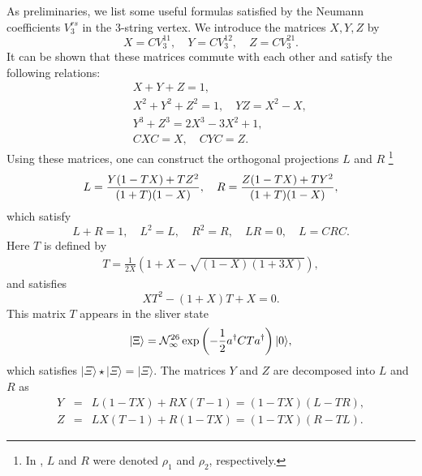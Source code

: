 \documentclass[a4paper,12pt]{article}
\def\hf{{1\over 2}}
\def\o{\over}
\def\ket{\rangle}
\def\lf{\left}
\def\ri{\right}
\def\dag{\dagger}
\def\a{a^{\dag}}
\begin{document}
As preliminaries, we list some useful formulas satisfied by
the Neumann coefficients $V^{rs}_3$ in the 3-string vertex.
We introduce the matrices $X,Y,Z$ by 
\begin{equation}
X=CV^{11}_3,\quad Y=CV^{12}_3,\quad Z=CV^{21}_3.
\end{equation}
It can be shown that these matrices commute with each other
and satisfy the following relations:
\begin{eqnarray}
 &&X+Y+Z=1, \\
&&X^2+Y^2+Z^2=1,\quad YZ=X^2-X,\\
&&Y^3+Z^3=2X^3-3X^2+1, \\
&&CXC=X,\quad CYC =Z.
\end{eqnarray}
Using these matrices,
one can construct the orthogonal projections $L$ and $R$ 
\footnote{In \cite{RSZ2}, $L$ and $R$ were denoted 
$\rho_1$ and $\rho_2$, respectively.}
\begin{equation}
 \label{LR}
L={Y(1-TX)+TZ^2\o (1+T)(1-X)},\quad 
R={Z(1-TX)+TY^2\o (1+T)(1-X)},  
\end{equation}
which satisfy
\begin{equation}
 \label{eqLR}
L+R=1,\quad L^2=L,\quad R^2=R,\quad LR=0,\quad L=CRC.
\end{equation}
Here $T$ is defined by 
\begin{eqnarray}
T=\frac{1}{2X} \lf(1+X - \sqrt{(1-X)(1+3X)}\ri),
\end{eqnarray}
and satisfies
\begin{equation}
 \label{eqT}
XT^2-(1+X)T+X=0.
\end{equation}
This matrix $T$ appears in the sliver state 
\cite{KosteleckyPotting,RSZ1}
\begin{equation}
 |\Xi\ket={\cal N}_{\infty}^{26}\exp\lf(-\hf\a CT\a\ri)|0\ket ,
\end{equation}
which satisfies $|\Xi\ket \star |\Xi\ket = |\Xi \ket$.
The matrices $Y$ and $Z$  are decomposed into $L$ and $R$ as
\begin{eqnarray}
Y&=&L(1-TX)+RX(T-1)=(1-TX)(L-TR), \\
Z&=&LX(T-1)+R(1-TX)=(1-TX)(R-TL).
\end{eqnarray}
\end{document}
